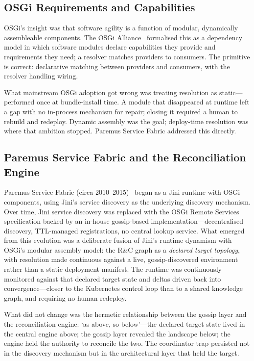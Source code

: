 \documentclass[11pt]{article}
\begin{document}
\subsection{OSGi Requirements and Capabilities}

OSGi's insight was that software agility is a function of modular, dynamically
assembleable components. The OSGi Alliance~\cite{osgi} formalised this as a
dependency model in which software modules declare capabilities they provide and
requirements they need; a resolver matches providers to consumers. The primitive
is correct: declarative matching between providers and consumers, with the
resolver handling wiring.

What mainstream OSGi adoption got wrong was treating resolution as
static---performed once at bundle-install time. A module that disappeared at
runtime left a gap with no in-process mechanism for repair; closing it required
a human to rebuild and redeploy. Dynamic assembly was the goal; deploy-time
resolution was where that ambition stopped. Paremus Service Fabric addressed
this directly.

\subsection{Paremus Service Fabric and the Reconciliation Engine}

Paremus Service Fabric (circa 2010--2015)~\cite{paremus} began as a Jini runtime
with OSGi components, using Jini's service discovery as the underlying discovery
mechanism. Over time, Jini service discovery was replaced with the OSGi Remote
Services specification backed by an in-house gossip-based
implementation---decentralised discovery, TTL-managed registrations, no central
lookup service. What emerged from this evolution was a deliberate fusion of
Jini's runtime dynamism with OSGi's modular assembly model: the R\&C graph as a
\emph{declared target topology}, with resolution made continuous against a live,
gossip-discovered environment rather than a static deployment manifest. The
runtime was continuously monitored against that declared target state and deltas
driven back into convergence---closer to the Kubernetes control loop than to a
shared knowledge graph, and requiring no human redeploy.

What did not change was the hermetic relationship between the gossip layer and
the reconciliation engine: `as above, so below'---the declared target state
lived in the central engine above; the gossip layer revealed the landscape below;
the engine held the authority to reconcile the two. The coordinator trap persisted
not in the discovery mechanism but in the architectural layer that held the
target.
\end{document}
